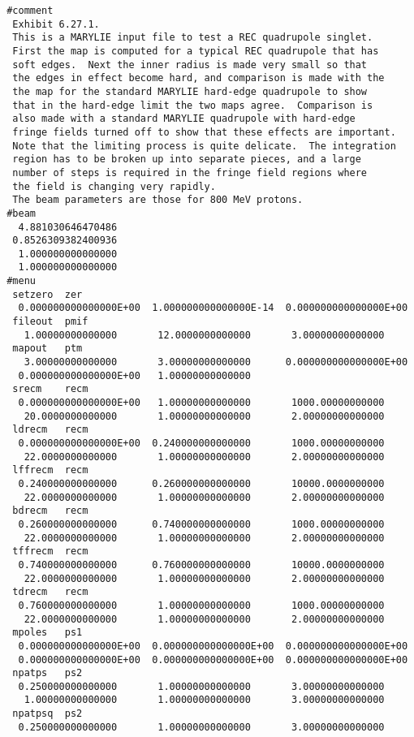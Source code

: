 \newpage
\begin{footnotesize}
\begin{verbatim}
 #comment
  Exhibit 6.27.1.
  This is a MARYLIE input file to test a REC quadrupole singlet.
  First the map is computed for a typical REC quadrupole that has
  soft edges.  Next the inner radius is made very small so that
  the edges in effect become hard, and comparison is made with the
  the map for the standard MARYLIE hard-edge quadrupole to show
  that in the hard-edge limit the two maps agree.  Comparison is
  also made with a standard MARYLIE quadrupole with hard-edge
  fringe fields turned off to show that these effects are important.
  Note that the limiting process is quite delicate.  The integration
  region has to be broken up into separate pieces, and a large
  number of steps is required in the fringe field regions where
  the field is changing very rapidly.
  The beam parameters are those for 800 MeV protons.
 #beam
   4.881030646470486
  0.8526309382400936
   1.000000000000000
   1.000000000000000
 #menu
  setzero  zer
   0.000000000000000E+00  1.000000000000000E-14  0.000000000000000E+00
  fileout  pmif
    1.00000000000000       12.0000000000000       3.00000000000000
  mapout   ptm
    3.00000000000000       3.00000000000000      0.000000000000000E+00
   0.000000000000000E+00   1.00000000000000
  srecm    recm
   0.000000000000000E+00   1.00000000000000       1000.00000000000
    20.0000000000000       1.00000000000000       2.00000000000000
  ldrecm   recm
   0.000000000000000E+00  0.240000000000000       1000.00000000000
    22.0000000000000       1.00000000000000       2.00000000000000
  lffrecm  recm
   0.240000000000000      0.260000000000000       10000.0000000000
    22.0000000000000       1.00000000000000       2.00000000000000
  bdrecm   recm
   0.260000000000000      0.740000000000000       1000.00000000000
    22.0000000000000       1.00000000000000       2.00000000000000
  tffrecm  recm
   0.740000000000000      0.760000000000000       10000.0000000000
    22.0000000000000       1.00000000000000       2.00000000000000
  tdrecm   recm
   0.760000000000000       1.00000000000000       1000.00000000000
    22.0000000000000       1.00000000000000       2.00000000000000
  mpoles   ps1
   0.000000000000000E+00  0.000000000000000E+00  0.000000000000000E+00
   0.000000000000000E+00  0.000000000000000E+00  0.000000000000000E+00
  npatps   ps2
   0.250000000000000       1.00000000000000       3.00000000000000
    1.00000000000000       1.00000000000000       3.00000000000000
  npatpsq  ps2
   0.250000000000000       1.00000000000000       3.00000000000000

\end{verbatim}
\end{footnotesize}
